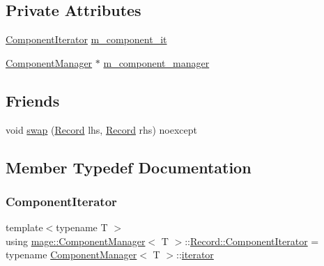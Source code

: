 \subsection*{Private Attributes}
\begin{DoxyCompactItemize}
\item 
\mbox{\hyperlink{classmage_1_1_component_manager_1_1_record_ac9f303d103be56826be484204f17c249}{Component\+Iterator}} \mbox{\hyperlink{classmage_1_1_component_manager_1_1_record_ab4826196f0aa79a8544e07165102d27c}{m\+\_\+component\+\_\+it}}
\item 
\mbox{\hyperlink{classmage_1_1_component_manager}{Component\+Manager}} $\ast$ \mbox{\hyperlink{classmage_1_1_component_manager_1_1_record_aeb161047c020be30cc0418e882ab9816}{m\+\_\+component\+\_\+manager}}
\end{DoxyCompactItemize}
\subsection*{Friends}
\begin{DoxyCompactItemize}
\item 
void \mbox{\hyperlink{classmage_1_1_component_manager_1_1_record_a0de7a3736a589ffd4ea3f1c27287666d}{swap}} (\mbox{\hyperlink{classmage_1_1_component_manager_1_1_record}{Record}} lhs, \mbox{\hyperlink{classmage_1_1_component_manager_1_1_record}{Record}} rhs) noexcept
\end{DoxyCompactItemize}


\subsection{Member Typedef Documentation}
\mbox{\label{classmage_1_1_component_manager_1_1_record_ac9f303d103be56826be484204f17c249}} 
\subsubsection{\texorpdfstring{Component\+Iterator}{ComponentIterator}}
{\footnotesize\ttfamily template$<$typename T $>$ \\
using \mbox{\hyperlink{classmage_1_1_component_manager}{mage\+::\+Component\+Manager}}$<$ T $>$\+::\mbox{\hyperlink{classmage_1_1_component_manager_1_1_record_ac9f303d103be56826be484204f17c249}{Record\+::\+Component\+Iterator}} =  typename \mbox{\hyperlink{classmage_1_1_component_manager}{Component\+Manager}}$<$ T $>$\+::\mbox{\hyperlink{classmage_1_1_component_manager_a28023a75938eb74870ba4b5952ddb61f}{iterator}}}



